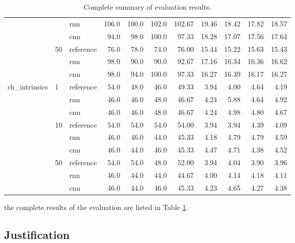 \begin{table}
{\begin{tabular}{lllrrrrrrrr}
	&    & rnn &         106.0 &  100.0 &  102.0 &  102.67 &         19.46 &  18.42 &  17.82 &  18.57 \\
	&    & cnn &          94.0 &   98.0 &  100.0 &   97.33 &         18.28 &  17.07 &  17.56 &  17.64 \\
	& 50 & reference &          76.0 &   78.0 &   74.0 &   76.00 &         15.44 &  15.22 &  15.63 &  15.43 \\
	&    & rnn &          98.0 &   90.0 &   90.0 &   92.67 &         17.16 &  16.34 &  16.36 &  16.62 \\
	&    & cnn &          98.0 &   94.0 &  100.0 &   97.33 &         16.27 &  16.39 &  16.17 &  16.27 \\
	ch\_intrinsics & 1  & reference &          54.0 &   48.0 &   46.0 &   49.33 &          3.94 &   4.00 &   4.64 &   4.19 \\
	&    & rnn &          46.0 &   46.0 &   48.0 &   46.67 &          4.24 &   5.88 &   4.64 &   4.92 \\
	&    & cnn &          46.0 &   46.0 &   48.0 &   46.67 &          4.24 &   4.98 &   4.80 &   4.67 \\
	& 10 & reference &          54.0 &   54.0 &   54.0 &   54.00 &          3.94 &   3.94 &   4.39 &   4.09 \\
	&    & rnn &          46.0 &   46.0 &   44.0 &   45.33 &          4.18 &   4.79 &   4.79 &   4.59 \\
	&    & cnn &          46.0 &   44.0 &   46.0 &   45.33 &          4.47 &   4.71 &   4.38 &   4.52 \\
	& 50 & reference &          54.0 &   54.0 &   48.0 &   52.00 &          3.94 &   4.04 &   3.90 &   3.96 \\
	&    & rnn &          46.0 &   44.0 &   44.0 &   44.67 &          4.00 &   4.14 &   4.18 &   4.11 \\
	&    & cnn &          46.0 &   44.0 &   46.0 &   45.33 &          4.23 &   4.65 &   4.27 &   4.38 \\
	\bottomrule
\end{tabular}
}
\caption{Complete summary of evaluation results.}
\label{table:eval-complete}
\end{table}


the complete results of the evaluation are listed in Table \ref{table:eval-complete}.

\subsection{Justification}

